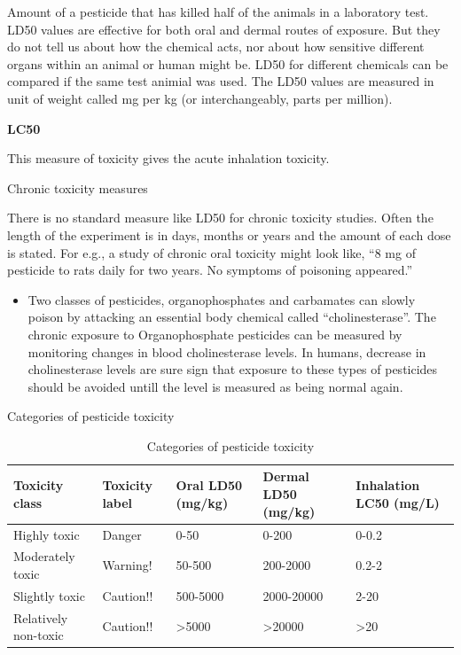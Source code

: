 \documentclass[
]{book}
\providecommand{\tightlist}{%
  \setlength{\itemsep}{0pt}\setlength{\parskip}{0pt}}
\begin{document}
Amount of a pesticide that has killed half of the animals in a laboratory test. LD50 values are effective for both oral and dermal routes of exposure. But they do not tell us about how the chemical acts, nor about how sensitive different organs within an animal or human might be. LD50 for different chemicals can be compared if the same test animial was used. The LD50 values are measured in unit of weight called mg per kg (or interchangeably, parts per million).

\textbf{LC50}

This measure of toxicity gives the acute inhalation toxicity.

Chronic toxicity measures

There is no standard measure like LD50 for chronic toxicity studies. Often the length of the experiment is in days, months or years and the amount of each dose is stated. For e.g., a study of chronic oral toxicity might look like, ``8 mg of pesticide to rats daily for two years. No symptoms of poisoning appeared.''

\begin{itemize}
\tightlist
\item
  Two classes of pesticides, organophosphates and carbamates can slowly poison by attacking an essential body chemical called ``cholinesterase''. The chronic exposure to Organophosphate pesticides can be measured by monitoring changes in blood cholinesterase levels. In humans, decrease in cholinesterase levels are sure sign that exposure to these types of pesticides should be avoided untill the level is measured as being normal again.
\end{itemize}

Categories of pesticide toxicity

\begin{table}

\caption{\label{tab:pesticide-hazard-category}Categories of pesticide toxicity}
\centering
\begin{tabular}[t]{lllll}
\toprule
Toxicity class & Toxicity label & Oral LD50 (mg/kg) & Dermal LD50 (mg/kg) & Inhalation LC50 (mg/L)\\
\midrule
Highly toxic & Danger & 0-50 & 0-200 & 0-0.2\\
Moderately toxic & Warning! & 50-500 & 200-2000 & 0.2-2\\
Slightly toxic & Caution!! & 500-5000 & 2000-20000 & 2-20\\
Relatively non-toxic & Caution!! & >5000 & >20000 & >20\\
\bottomrule
\end{tabular}
\end{table}
\end{document}
